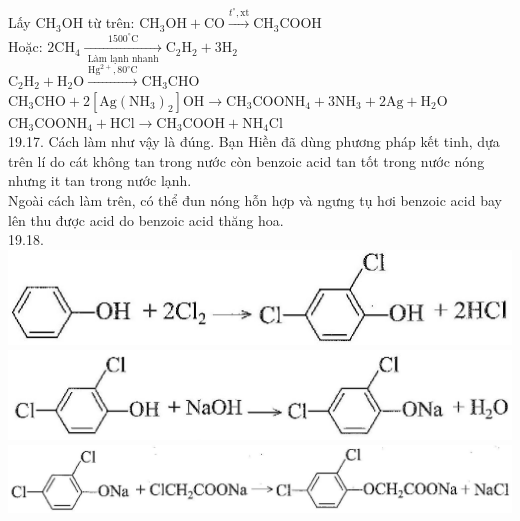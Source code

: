 \documentclass[10pt]{article}
\begin{document}
Lấy $\mathrm{CH}_{3} \mathrm{OH}$ từ trên: $\mathrm{CH}_{3} \mathrm{OH}+\mathrm{CO} \xrightarrow{t^{\circ}, \mathrm{xt}} \mathrm{CH}_{3} \mathrm{COOH}$\\
Hoặc: $2 \mathrm{CH}_{4} \xrightarrow[\text { Làm lạnh nhanh }]{1500^{\circ} \mathrm{C}} \mathrm{C}_{2} \mathrm{H}_{2}+3 \mathrm{H}_{2}$\\
$\mathrm{C}_{2} \mathrm{H}_{2}+\mathrm{H}_{2} \mathrm{O} \xrightarrow{\mathrm{Hg}^{2+}, 80^{\circ} \mathrm{C}} \mathrm{CH}_{3} \mathrm{CHO}$\\
$\mathrm{CH}_{3} \mathrm{CHO}+2\left[\mathrm{Ag}\left(\mathrm{NH}_{3}\right)_{2}\right] \mathrm{OH} \longrightarrow \mathrm{CH}_{3} \mathrm{COONH}_{4}+3 \mathrm{NH}_{3}+2 \mathrm{Ag}+\mathrm{H}_{2} \mathrm{O}$\\
$\mathrm{CH}_{3} \mathrm{COONH}{ }_{4}+\mathrm{HCl} \rightarrow \mathrm{CH}_{3} \mathrm{COOH}+\mathrm{NH}_{4} \mathrm{Cl}$\\
19.17. Cách làm như vậy là đúng. Bạn Hiền đã dùng phương pháp kết tinh, dựa trên lí do cát không tan trong nước còn benzoic acid tan tốt trong nước nóng nhưng it tan trong nước lạnh.\\
Ngoài cách làm trên, có thể đun nóng hỗn hợp và ngưng tụ hơi benzoic acid bay lên thu được acid do benzoic acid thăng hoa.\\
19.18.\\
\includegraphics[max width=\textwidth, center]{2025_10_23_052d3249fabea90c1e95g-30(1)}\\
\includegraphics[max width=\textwidth, center]{2025_10_23_052d3249fabea90c1e95g-30}\\
\includegraphics[max width=\textwidth, center]{2025_10_23_052d3249fabea90c1e95g-30(2)}\\
\end{document}
